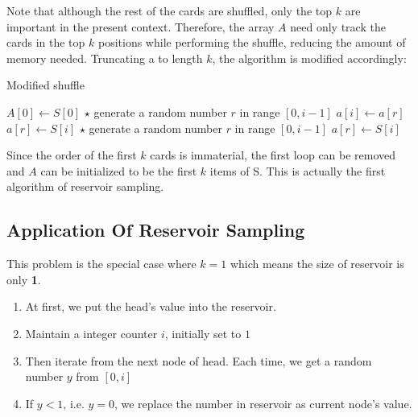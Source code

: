 Note that although the rest of the cards are shuffled, only the top $k$ are important in the present context. Therefore, the array $A$ need only track the cards in the top $k$ positions while performing the shuffle, reducing the amount of memory needed. Truncating a to length $k$, the algorithm is modified accordingly: 

\begin{algorithm}[H]
\caption{Modified shuffle}
\begin{algorithmic}[1]
\State $A[0]\gets S[0]$
\State $\star$ generate a random number $r$ in range $[0, i-1]$
\State $a[i]\gets a[r]$
\State $a[r]\gets S[i]$
\EndFor
{}
\State $\star$ generate a random number $r$ in range $[0, i-1]$
\State $a[r]\gets S[i]$
\EndIf
\EndFor
\EndProcedure
\end{algorithmic}
\end{algorithm}

Since the order of the first $ k $ cards is immaterial, the first loop can be removed and $A$ can be initialized to be the first $k$ items of S. This is actually the first algorithm of reservoir sampling.

\subsection{Application Of Reservoir Sampling}
This problem is the special case where $k=1$ which means the size of reservoir is only \textbf{1}.
\begin{enumerate}
\item At first, we put the head's value into the reservoir.
\item Maintain a integer counter $i$, initially set to $1$
\item Then iterate from the next node of head. Each time, we get a random number $y$ from $[0,i]$
\item If $y< 1$, i.e. $y=0$, we replace the number in reservoir as current node's value.
\end{enumerate}

